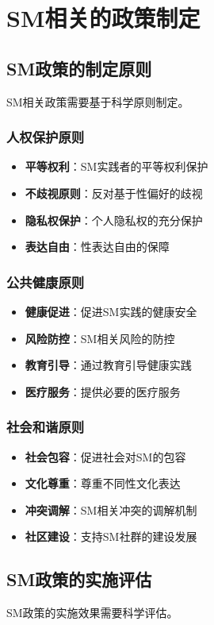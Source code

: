 \documentclass[12pt,UTF8]{ctexbook}
\begin{document}
\chapter{SM相关的政策制定}
\section{SM政策的制定原则}
SM相关政策需要基于科学原则制定。

\subsection{人权保护原则}
\begin{itemize}[leftmargin=2cm]
	\item \textbf{平等权利}：SM实践者的平等权利保护
	\item \textbf{不歧视原则}：反对基于性偏好的歧视
	\item \textbf{隐私权保护}：个人隐私权的充分保护
	\item \textbf{表达自由}：性表达自由的保障
\end{itemize}

\subsection{公共健康原则}
\begin{itemize}[leftmargin=2cm]
	\item \textbf{健康促进}：促进SM实践的健康安全
	\item \textbf{风险防控}：SM相关风险的防控
	\item \textbf{教育引导}：通过教育引导健康实践
	\item \textbf{医疗服务}：提供必要的医疗服务
\end{itemize}

\subsection{社会和谐原则}
\begin{itemize}[leftmargin=2cm]
	\item \textbf{社会包容}：促进社会对SM的包容
	\item \textbf{文化尊重}：尊重不同性文化表达
	\item \textbf{冲突调解}：SM相关冲突的调解机制
	\item \textbf{社区建设}：支持SM社群的建设发展
\end{itemize}

\section{SM政策的实施评估}
SM政策的实施效果需要科学评估。
\end{document}
